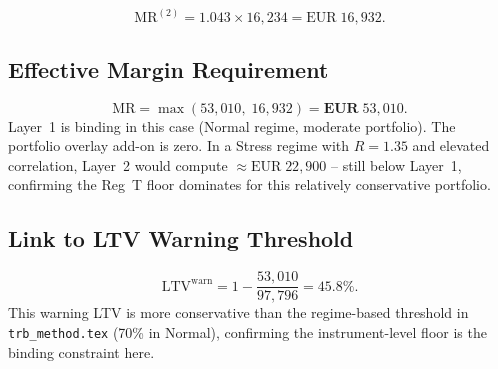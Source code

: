 \documentclass[12pt, a4paper]{article}
\newcommand{\MR}{\mathrm{MR}}
\newcommand{\LTV}{\mathrm{LTV}}
\begin{document}
\[
\MR^{(2)} = 1.043 \times 16{,}234 = \text{EUR}\;16{,}932.
\]

\subsection*{Effective Margin Requirement}
\[
\MR = \max(53{,}010,\; 16{,}932) = \textbf{EUR}\;53{,}010.
\]
Layer~1 is binding in this case (Normal regime, moderate portfolio).
The portfolio overlay add-on is zero. In a Stress regime with
$R = 1.35$ and elevated correlation, Layer~2 would compute
$\approx \text{EUR}\;22{,}900$ -- still below Layer~1, confirming
the Reg~T floor dominates for this relatively conservative portfolio.

\subsection*{Link to LTV Warning Threshold}
\[
\LTV^{\mathrm{warn}} = 1 - \frac{53{,}010}{97{,}796} = 45.8\%.
\]
This warning LTV is more conservative than the regime-based threshold
in \texttt{trb\_method.tex} (70\% in Normal), confirming the
instrument-level floor is the binding constraint here.
\end{document}
